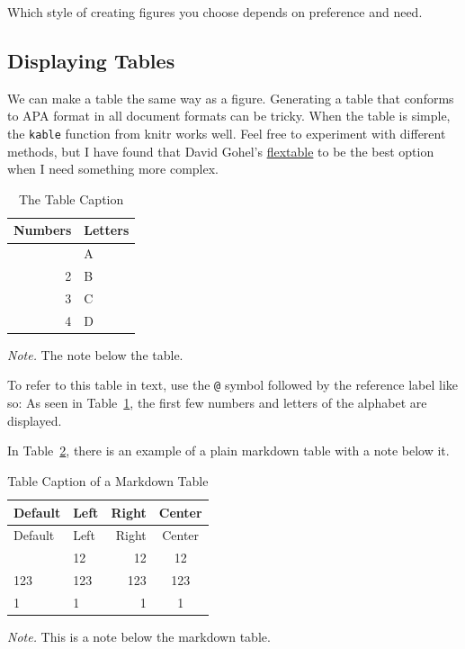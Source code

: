 \documentclass[
  jou,
  floatsintext,
  longtable,
  nolmodern,
  notxfonts,
  notimes,
  colorlinks=true,linkcolor=blue,citecolor=blue,urlcolor=blue]{apa7}
\begin{document}
Which style of creating figures you choose depends on preference and
need.

\subsection{Displaying Tables}\label{displaying-tables}

We can make a table the same way as a figure. Generating a table that
conforms to APA format in all document formats can be tricky. When the
table is simple, the \texttt{kable} function from knitr works well. Feel
free to experiment with different methods, but I have found that David
Gohel's \href{https://davidgohel.github.io/flextable/}{flextable} to be
the best option when I need something more complex.

\begin{ThreePartTable}

\begin{longtable}[]{@{}rl@{}}

\caption{\label{tbl-mytable}The Table Caption}

\tabularnewline

\toprule\noalign{}
Numbers & Letters \\
\midrule\noalign{}
\endhead
\bottomrule\noalign{}
\endlastfoot
1 & A \\
2 & B \\
3 & C \\
4 & D \\

\end{longtable}

{\noindent \emph{Note.} The note below the table.}

\end{ThreePartTable}

To refer to this table in text, use the \texttt{@} symbol followed by
the reference label like so: As seen in Table~\ref{tbl-mytable}, the
first few numbers and letters of the alphabet are displayed.

In Table~\ref{tbl-mymarkdowntable}, there is an example of a plain
markdown table with a note below it.

\begin{ThreePartTable}

\begin{longtable}[]{@{}llrc@{}}
\caption{Table Caption of a Markdown
Table}\label{tbl-mymarkdowntable}\tabularnewline
\toprule\noalign{}
Default & Left & Right & Center \\
\midrule\noalign{}
\endfirsthead
\toprule\noalign{}
Default & Left & Right & Center \\
\midrule\noalign{}
\endhead
\bottomrule\noalign{}
\endlastfoot
12 & 12 & 12 & 12 \\
123 & 123 & 123 & 123 \\
1 & 1 & 1 & 1 \\
\end{longtable}

{\noindent \emph{Note.} This is a note below the markdown table.}

\end{ThreePartTable}
\end{document}
